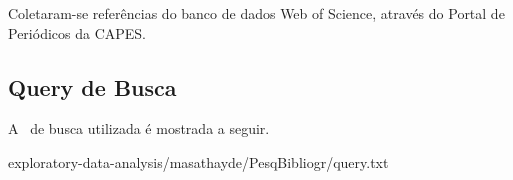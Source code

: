 Coletaram-se referências do banco de dados Web of Science, através do Portal de Periódicos da CAPES.


\subsection{Query de Busca}

A \query\ de busca utilizada é mostrada a seguir.


{exploratory-data-analysis/masathayde/PesqBibliogr/query.txt}

